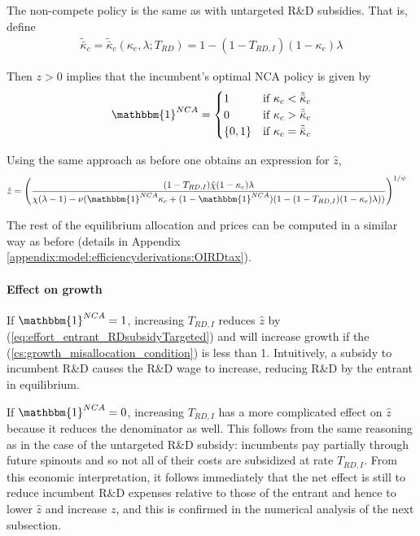 \documentclass[11pt,english]{article}
\begin{document}
The non-compete policy is the same as with untargeted R\&D subsidies. That is, define
\begin{align}
\tilde{\bar{\kappa}}_c = \tilde{\bar{\kappa}}_c(\kappa_e,\lambda;T_{RD}) = 1 - (1-T_{RD,I})(1-\kappa_e)\lambda
\end{align} 

Then $z > 0$ implies that the incumbent's optimal NCA policy is given by 
\begin{align}
\mathbbm{1}^{NCA} = \begin{cases}
1 & \textrm{if } \kappa_{c} < \tilde{\bar{\kappa}}_c  \\
0 & \textrm{if } \kappa_{c} > \tilde{\bar{\kappa}}_c \\
\{0,1\} & \textrm{if } \kappa_c = \tilde{\bar{\kappa}}_c 
\end{cases} \label{eq:nca_policy_RDsubsidyTargeted}
\end{align}

Using the same approach as before one obtains an expression for $\hat{z}$, 
\begin{align}
\hat{z} &= \Bigg( \frac{(1-T_{RD,I})\hat{\chi} (1-\kappa_{e}) \lambda}{\chi(\lambda -1) - \nu (\mathbbm{1}^{NCA} \kappa_c + (1-\mathbbm{1}^{NCA})(1 - (1-T_{RD,I})(1-\kappa_e)\lambda)) } \Bigg)^{1/\psi} \label{eq:effort_entrant_RDsubsidyTargeted}
\end{align}

The rest of the equilibrium allocation and prices can be computed in a similar way as before (details in Appendix \ref{appendix:model:efficiencyderivations:OIRDtax}). 






\paragraph{Effect on growth}

If $\mathbbm{1}^{NCA} = 1$, increasing $T_{RD,I}$ reduces $\hat{z}$ by (\ref{eq:effort_entrant_RDsubsidyTargeted}) and will increase growth if the (\ref{cs:growth_misallocation_condition}) is less than 1. Intuitively, a subsidy to incumbent R\&D causes the R\&D wage to increase, reducing R\&D by the entrant in equilibrium. 

If $\mathbbm{1}^{NCA} = 0$, increasing $T_{RD,I}$ has a more complicated effect on $\hat{z}$ because it reduces the denominator as well. This follows from the same reasoning as in the case of the untargeted R\&D subsidy: incumbents pay partially through future spinouts and so not all of their costs are subsidized at rate $T_{RD,I}$. From this economic interpretation, it follows immediately that the net effect is still to reduce incumbent R\&D expenses relative to those of the entrant and hence to lower $\hat{z}$ and increase $z$, and this is confirmed in the numerical analysis of the next subsection.
\end{document}
